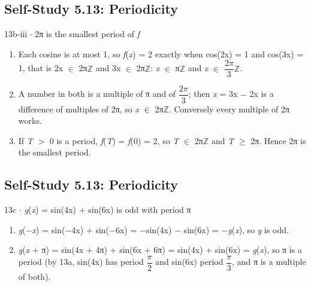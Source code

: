 \documentclass[11pt]{article}
\begin{document}
\begin{keepsection}\subsection{Self-Study 5.13: Periodicity}

\begin{workedbox}{13b-iii \ensuremath{\cdot} 2π is the smallest period of \textit{f}}
\begin{enumerate}
\item Each cosine is at most 1, so \textit{f}(\textit{x}) = 2 exactly when cos(2x) = 1 and cos(3x) = 1, that is 2x \ensuremath{\in} 2π\ensuremath{\mathbb{Z}} and 3x \ensuremath{\in} 2π\ensuremath{\mathbb{Z}}: \textit{x} \ensuremath{\in} π\ensuremath{\mathbb{Z}} and \textit{x} \ensuremath{\in} {\small\ensuremath{\dfrac{2π}{3}}}\ensuremath{\mathbb{Z}}.
\item A number in both is a multiple of π and of {\small\ensuremath{\dfrac{2π}{3}}}; then \textit{x} = 3x \ensuremath{-} 2x is a difference of multiples of 2π, so \textit{x} \ensuremath{\in} 2π\ensuremath{\mathbb{Z}}. Conversely every multiple of 2π works.
\item If \textit{T} \ensuremath{>} 0 is a period, \textit{f}(\textit{T}) = \textit{f}(0) = 2, so \textit{T} \ensuremath{\in} 2π\ensuremath{\mathbb{Z}} and \textit{T} \ensuremath{\geq} 2π. Hence 2π is the smallest period.
\end{enumerate}
\end{workedbox}

\end{keepsection}
\begin{keepsection}\subsection{Self-Study 5.13: Periodicity}

\begin{workedbox}{13c \ensuremath{\cdot} \textit{g}(\textit{x}) = sin(4x) + sin(6x) is odd with period π}
\begin{enumerate}
\item \textit{g}(\ensuremath{-}\textit{x}) = sin(\ensuremath{-}4x) + sin(\ensuremath{-}6x) = \ensuremath{-}sin(4x) \ensuremath{-} sin(6x) = \ensuremath{-}\textit{g}(\textit{x}), so \textit{g} is odd.
\item \textit{g}(\textit{x} + π) = sin(4x + 4π) + sin(6x + 6π) = sin(4x) + sin(6x) = \textit{g}(\textit{x}), so π is a period (by 13a, sin(4x) has period {\small\ensuremath{\dfrac{π}{2}}} and sin(6x) period {\small\ensuremath{\dfrac{π}{3}}}, and π is a multiple of both).
\end{enumerate}
\end{workedbox}

\end{keepsection}
\end{document}
